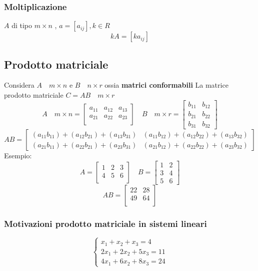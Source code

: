 \subsubsection*{Moltiplicazione}
$A$ di tipo $m \times n$ , $ a = \left[ a_{ij} \right] , k  \in  R$
\[
	kA = \left[ ka_{ij}\right]
\]
\subsection{Prodotto matriciale}
Considera $ A \quad  m \times n$ e $B \quad  n \times r$ ossia \textbf{matrici conformabili}
\vskip3mm
La matrice prodotto matriciale $ C = AB \quad m \times r$
\[
	A \quad m \times n= \begin{bmatrix}
		a_{11} & a_{12} & a_{13} \\
		a_{21} & a_{22} & a_{23} \\
	\end{bmatrix}
	\quad
	B \quad  m \times r = \begin{bmatrix}
		b_{11} & b_{12} \\
		b_{21} & b_{22} \\
		b_{31} & b_{32}
	\end{bmatrix}
\]
\[
	AB= \begin{bmatrix}
		\left( a_{11}  b_{11} \right) + \left( a_{12} b_{21} \right) + \left( a_{13} b_{31} \right) & \left( a_{11} b_{12} \right) + \left( a_{12} b_{22} \right)  + \left( a_{13} b_{32} \right) \\
		\left( a_{21} b_{11} \right) + \left( a_{22} b_{21} \right) + \left( a_{23} b_{31} \right)  & \left( a_{21}b_{12} \right) + \left( a_{22}b_{22} \right) + \left( a_{23}b_{32} \right)
	\end{bmatrix}
\]
Esempio:
\[
	A = \begin{bmatrix}
		1 & 2 & 3 \\
		4 & 5 & 6 \\
	\end{bmatrix}
	\quad
	B=
	\begin{bmatrix}
		1 & 2 \\
		3 & 4 \\
		5 & 6
	\end{bmatrix}
\]
\[
	AB= \begin{bmatrix}
		22 & 28 \\
		49 & 64 \\
	\end{bmatrix}
\]
\subsubsection*{Motivazioni prodotto matriciale in sistemi lineari}
\[
	\begin{cases}
		x_1 + x_2 + x_3 = 4     \\
		2x_1 + 2x_2 + 5x_3 = 11 \\
		4x_1 + 6x_2 + 8x_3 = 24
	\end{cases}
\]

